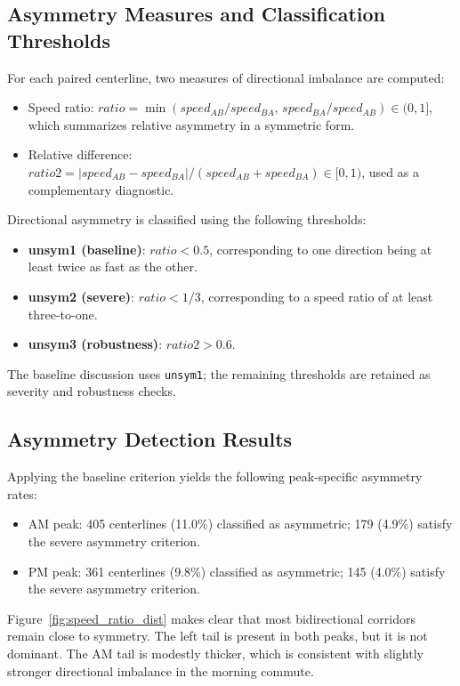 \documentclass[12pt]{article}
\begin{document}
	\subsection{Asymmetry Measures and Classification Thresholds}
	
	For each paired centerline, two measures of directional imbalance are computed:
	\begin{itemize}
		\item Speed ratio: $ratio = \min(speed_{AB}/speed_{BA},\, speed_{BA}/speed_{AB}) \in (0,1]$, which summarizes relative asymmetry in a symmetric form.
		\item Relative difference: $ratio2 = |speed_{AB} - speed_{BA}| / (speed_{AB} + speed_{BA}) \in [0,1)$, used as a complementary diagnostic.
	\end{itemize}
	
	Directional asymmetry is classified using the following thresholds:
	\begin{itemize}
		\item \textbf{unsym1 (baseline)}: $ratio < 0.5$, corresponding to one direction being at least twice as fast as the other.
		\item \textbf{unsym2 (severe)}: $ratio < 1/3$, corresponding to a speed ratio of at least three-to-one.
		\item \textbf{unsym3 (robustness)}: $ratio2 > 0.6$.
	\end{itemize}
	The baseline discussion uses \texttt{unsym1}; the remaining thresholds are retained as severity and robustness checks.
	
	\subsection{Asymmetry Detection Results}
	
	Applying the baseline criterion yields the following peak-specific asymmetry rates:
	\begin{itemize}
		\item AM peak: 405 centerlines (11.0\%) classified as asymmetric; 179 (4.9\%) satisfy the severe asymmetry criterion.
		\item PM peak: 361 centerlines (9.8\%) classified as asymmetric; 145 (4.0\%) satisfy the severe asymmetry criterion.
	\end{itemize}
	
	Figure~\ref{fig:speed_ratio_dist} makes clear that most bidirectional corridors remain close to symmetry. The left tail is present in both peaks, but it is not dominant. The AM tail is modestly thicker, which is consistent with slightly stronger directional imbalance in the morning commute.
	
\end{document}

